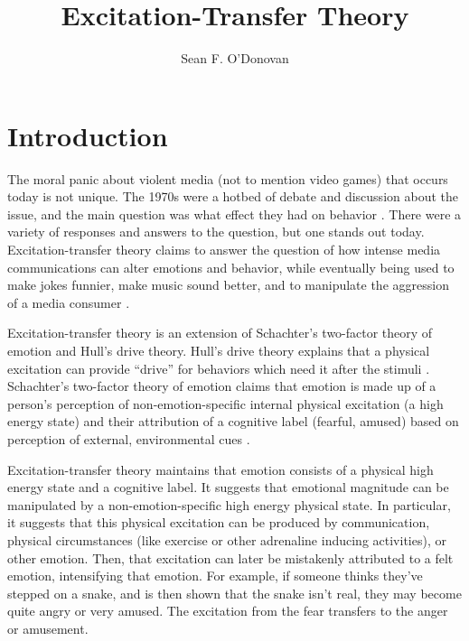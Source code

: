 \documentclass[
  stu,
  12pt]{apa7}
\affiliation{Brian Lamb School of Communication}
\title{Excitation-Transfer Theory}
\author{Sean F. O'Donovan}
\date{}
\begin{document}
\setlength{\parskip}{0pt}

\maketitle

\hypertarget{introduction}{%
\section{Introduction}\label{introduction}}

The moral panic about violent media (not to mention video games) that
occurs today is not unique. The 1970s were a hotbed of debate and
discussion about the issue, and the main question was what effect they
had on behavior \autocite[ 32]{bryExcitationTransferTheoryThreeFactor}.
There were a variety of responses and answers to the question, but one
stands out today. Excitation-transfer theory claims to answer the
question of how intense media communications can alter emotions and
behavior, while eventually being used to make jokes
funnier\autocite{canEnhancementHumorAppreciation}, make music sound
better\autocite{canEffectAffectiveState}, and to manipulate the
aggression of a media consumer \autocite{zilEffectResidualExcitation}.

Excitation-transfer theory is an extension of Schachter's two-factor
theory of emotion and Hull's drive theory. Hull's drive theory explains
that a physical excitation can provide ``drive'' for behaviors which
need it after the stimuli \autocite[
33]{bryExcitationTransferTheoryThreeFactor}. Schachter's two-factor
theory of emotion claims that emotion is made up of a person's
perception of non-emotion-specific internal physical excitation (a high
energy state) and their attribution of a cognitive label (fearful,
amused) based on perception of external, environmental cues \autocite[
33]{bryExcitationTransferTheoryThreeFactor}.

Excitation-transfer theory maintains that emotion consists of a physical
high energy state and a cognitive label. It suggests that emotional
magnitude can be manipulated by a non-emotion-specific high energy
physical state. In particular, it suggests that this physical excitation
can be produced by communication, physical circumstances (like exercise
or other adrenaline inducing activities), or other emotion. Then, that
excitation can later be mistakenly attributed to a felt emotion,
intensifying that emotion. For example, if someone thinks they've
stepped on a snake, and is then shown that the snake isn't real, they
may become quite angry or very amused. The excitation from the fear
transfers to the anger or amusement.
\end{document}
